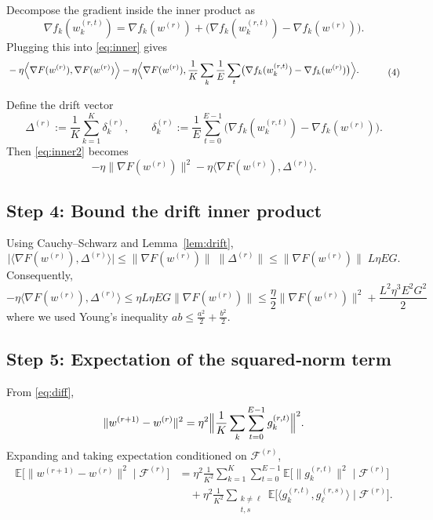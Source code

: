 \documentclass{article}
\newcommand{\E}{\mathbb{E}}
\begin{document}
Decompose the gradient inside the inner product as
\[
\nabla f_k(w_{k}^{(r,t)})=
\nabla f_k(w^{(r)}) + \bigl(\nabla f_k(w_{k}^{(r,t)})-\nabla f_k(w^{(r)})\bigr).
\]
Plugging this into \eqref{eq:inner} gives
\[
\begin{aligned}
&-\eta\Bigl\langle\nabla F(w^{(r)}),
      \nabla F(w^{(r)})\Bigr\rangle
   -\eta\Bigl\langle\nabla F(w^{(r)}),
      \frac{1}{K}\sum_{k}\frac{1}{E}\sum_{t}
      \bigl(\nabla f_k(w_{k}^{(r,t)})-\nabla f_k(w^{(r)})\bigr)
      \Bigr\rangle .
\end{aligned}
\tag{4}
\label{eq:inner2}
\]

Define the drift vector
\[
\Delta^{(r)}:=\frac{1}{K}\sum_{k=1}^{K}\delta_k^{(r)},
\qquad
\delta_k^{(r)}:=\frac{1}{E}\sum_{t=0}^{E-1}
\bigl(\nabla f_k(w_{k}^{(r,t)})-\nabla f_k(w^{(r)})\bigr) .
\]
Then \eqref{eq:inner2} becomes
\[
-\eta\|\nabla F(w^{(r)})\|^2 -\eta\langle\nabla F(w^{(r)}),\Delta^{(r)}\rangle .
\tag{5}
\label{eq:inner3}
\]

\subsection*{Step 4: Bound the drift inner product}
Using Cauchy–Schwarz and Lemma~\ref{lem:drift},
\[
\bigl|\langle\nabla F(w^{(r)}),\Delta^{(r)}\rangle\bigr|
\le \|\nabla F(w^{(r)})\|\;\|\Delta^{(r)}\|
\le \|\nabla F(w^{(r)})\|\;L\eta E G .
\tag{6}
\label{eq:driftbound}
\]
Consequently,
\[
-\eta\langle\nabla F(w^{(r)}),\Delta^{(r)}\rangle
\le \eta L\eta E G\|\nabla F(w^{(r)})\|
\le \frac{\eta}{2}\|\nabla F(w^{(r)})\|^2
     + \frac{L^2\eta^3E^2G^2}{2}
\tag{7}
\label{eq:young}
\]
where we used Young’s inequality $ab\le \frac{a^2}{2}+\frac{b^2}{2}$.

\subsection*{Step 5: Expectation of the squared‑norm term}
From \eqref{eq:diff},
\[
\|w^{(r+1)}-w^{(r)}\|^2
= \eta^2\Bigl\|\frac{1}{K}\sum_{k}\sum_{t=0}^{E-1} g_{k}^{(r,t)}\Bigr\|^2 .
\]
Expanding and taking expectation conditioned on $\mathcal{F}^{(r)}$,
\[
\begin{aligned}
\E\!\bigl[\|w^{(r+1)}-w^{(r)}\|^2\mid\mathcal{F}^{(r)}\bigr]
&= \eta^2\frac{1}{K^2}\sum_{k=1}^{K}\sum_{t=0}^{E-1}
   \E\!\bigl[\|g_{k}^{(r,t)}\|^2\mid\mathcal{F}^{(r)}\bigr]  \\
&\quad +\eta^2\frac{1}{K^2}\!\!\sum_{\substack{k\neq\ell\\
t,s}}\!\!\E\!\bigl[\langle g_{k}^{(r,t)},g_{\ell}^{(r,s)}\rangle\mid\mathcal{F}^{(r)}\bigr].
\end{aligned}
\tag{8}
\label{eq:squared}
\]
\end{document}
